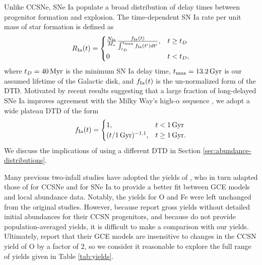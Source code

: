 \documentclass[twocolumn,twocolappendix,linenumbers]{aastex631}
\begin{document}
Unlike CCSNe, SNe Ia populate a broad distribution of delay times between progenitor formation and explosion. The time-dependent SN Ia rate per unit mass of star formation is defined as
\begin{equation}
    R_{\rm Ia}(t) = 
    \begin{cases}
        \frac{N_{\rm Ia}}{M_\star}
        \frac{f_{\rm Ia}(t)}{\int_{t_D}^{t_{\rm max}} f_{\rm Ia}(t') dt'}, & t \ge t_D \\
        0 & t < t_D,
    \end{cases}
    \label{eq:dtd-function}
\end{equation}
where $t_D=40\,{\rm Myr}$ is the minimum SN Ia delay time, $t_{\rm max}=13.2\,{\rm Gyr}$ is our assumed lifetime of the Galactic disk, and $f_{\rm Ia}(t)$ is the un-normalized form of the DTD. Motivated by recent results suggesting that a large fraction of long-delayed SNe Ia improves agreement with the Milky Way's high-$\alpha$ sequence \citep{palicio_analytic_2023,dubay_galactic_2024}, we adopt a wide plateau DTD of the form
\begin{equation}
    \label{eq:plateau-dtd}
    f_{\rm Ia}(t) =
    \begin{cases}
        1, & t < 1\,{\rm Gyr} \\
        (t/1\,{\rm Gyr})^{-1.1}, & t \ge 1\,{\rm Gyr}.
    \end{cases}
\end{equation}
We discuss the implications of using a different DTD in Section \ref{sec:abundance-distributions}.

Many previous two-infall studies have adopted the yields of \citet{francois_evolution_2004}, who in turn adapted those of \citet{woosley_evolution_1995} for CCSNe and \citet{iwamoto_nucleosynthesis_1999} for SNe Ia to provide a better fit between GCE models and local abundance data. Notably, the yields for O and Fe were left unchanged from the original studies. However, because \citet{woosley_evolution_1995} report gross yields without detailed initial abundances for their CCSN progenitors, and because \citet{francois_evolution_2004} do not provide population-averaged yields, it is difficult to make a comparison with our yields. Ultimately, \citet{francois_evolution_2004} report that their GCE models are insensitive to changes in the CCSN yield of O by a factor of 2, so we consider it reasonable to explore the full range of yields given in Table \ref{tab:yields}.
\end{document}
